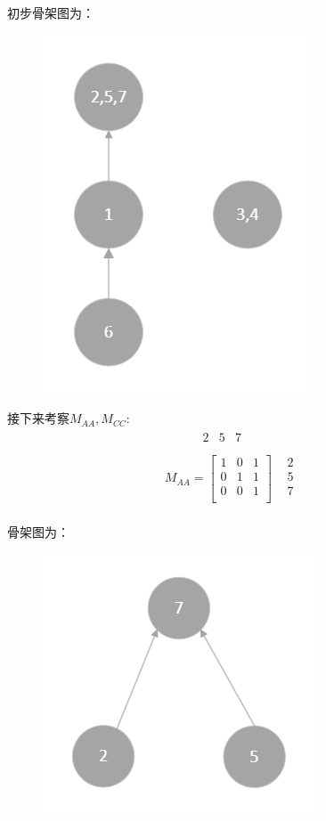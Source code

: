 \documentclass[UTF8]{ctexart}
\begin{document}
初步骨架图为：

\begin{figure}[H]
  \centering
  \includegraphics[scale=0.8]{1.png}
\end{figure}

接下来考察$M_{AA},M_{CC}$:
$$
\begin{matrix}\begin{matrix}~~~~~~~~~~~~2&5&7\\\end{matrix}&\ \\M_{AA}=\left[\begin{matrix}1&0&1\\0&1&1\\0&0&1\\\end{matrix}\right]&\begin{matrix}2\\5\\7\\\end{matrix}\\\end{matrix}
$$

骨架图为：

\begin{figure}[H]
  \centering
  \includegraphics[scale=0.8]{2.png}
\end{figure}
\end{document}
